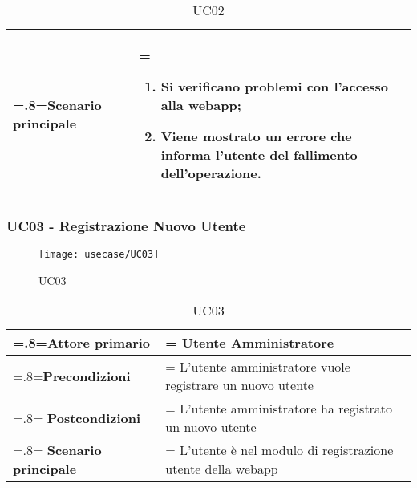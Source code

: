  			\begin{table}[H]
                	\centering
                		\renewcommand{\arraystretch}{1.8}
                		\renewcommand\tabularxcolumn[1]{m{#1}}
                		\begin{tabularx}{0.9\textwidth} {
                    >{\hsize=.8\hsize\linewidth=\hsize}X
                    >{\hsize=1.2\hsize\linewidth=\hsize}X}
                    \hline
                    \textbf{Scenario principale} &
                           \begin{enumerate}
                                \item Si verificano problemi con l'accesso alla webapp;
                                \item Viene mostrato un errore che informa l'utente del fallimento dell'operazione.
                           \end{enumerate} \\
                                            \hline
                    \end{tabularx}
                    \caption{UC02}
          	\end{table}



\subsubsection{UC03 - Registrazione Nuovo Utente}
\begin{figure}[H]
    \centering 
    \texttt{[image: usecase/UC03]}
    \caption{UC03}
\end{figure}
  \begin{table}[H]
                \centering
                \renewcommand{\arraystretch}{1.8}
                \renewcommand\tabularxcolumn[1]{m{#1}}
                \begin{tabularx}{0.9\textwidth} {
                    >{\hsize=.8\hsize\linewidth=\hsize}X
                    >{\hsize=1.2\hsize\linewidth=\hsize}X}
                    \hline
                    \textbf{Attore primario} & Utente Amministratore\\
                    \hline
             
                    \hline
                    \textbf{Precondizioni} & L'utente amministratore vuole registrare un nuovo utente\\
                    \hline
                    \textbf{Postcondizioni} & L'utente amministratore ha registrato un nuovo utente\\
                    \hline
                    \textbf{Scenario principale} & L'utente è nel modulo di registrazione utente della webapp\\
                    \hline
              
                \end{tabularx}
                \caption{UC03}
            \end{table}

